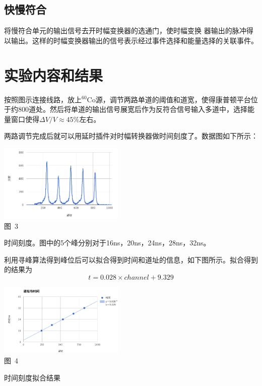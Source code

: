 \documentclass[a4paper,10.0pt,twoside]{npr}
\begin{document}
\begin{multicols}{2}
\subsection{快慢符合}将慢符合单元的输出信号去开时幅变换器的选通门，使时幅变换
器输出的脉冲得以输出。这样的时幅变换器输出的信号表示经过事件选择和能量选择的关联事件。

\section{实验内容和结果}

按照图示连接线路，放上$^{60}$Co源，调节两路单道的阈值和道宽，使得康普顿平台位于约800道处。然后将单道的输出信号展宽后作为反符合信号输入多道中，选择能量窗口使得$\Delta V/V\approx 45\%$左右。

两路调节完成后就可以用延时插件对时幅转换器做时间刻度了。数据图如下所示：

\begin{center}
   \includegraphics[width=0.45\textwidth]{3.png}
\\
\xiaowu\song 图~3\begin{minipage}[t]{75mm} \quad 时间刻度。图中的5个峰分别对于16ns，20ns，24ns，28ns，32ns。\\[-1mm]\wuhao
\end{minipage}
\end{center}

利用寻峰算法得到峰位后可以拟合得到时间和道址的信息，如下图所示。拟合得到的结果为 $$t = 0.028 \times channel + 9.329$$

\begin{center}
   \includegraphics[width=0.45\textwidth]{4.png}
\\
\xiaowu\song 图~4\begin{minipage}[t]{75mm} \quad 时间刻度拟合结果\\[-1mm]\wuhao
\end{minipage}
\end{center}


\end{multicols}
\end{document}
